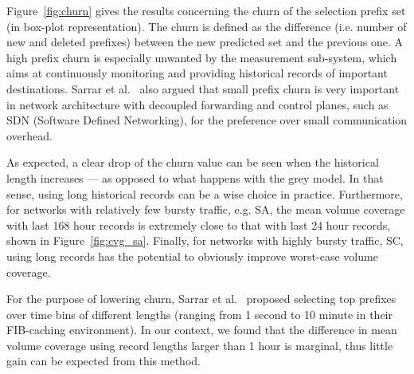 Figure~\ref{fig:churn} gives the results concerning the churn of the selection prefix set (in box-plot representation).
The churn is defined as the difference (i.e. number of new and deleted prefixes) between the new predicted set and the previous one. A high prefix churn is especially unwanted by the measurement sub-system, which aims at continuously monitoring and providing historical records of important destinations.  Sarrar et al.\ \cite{Sarrar2012} also argued that small prefix churn is very important in network architecture with decoupled forwarding and control planes, such as SDN (Software Defined Networking), for the preference over small communication overhead.

As expected, a clear drop of the churn value can be seen when the historical length increases --- as opposed to what happens with the grey model.
In that sense, using long historical records can be a wise choice in practice.
Furthermore, for networks with relatively few bursty traffic, e.g. SA, the mean volume coverage with last 168 hour records is extremely close to that with last 24 hour records, shown in Figure~\ref{fig:cvg_sa}.
Finally, for networks with highly bursty traffic, SC, using long records has the potential to obviously improve worst-case volume coverage. 

For the purpose of lowering churn, Sarrar et al.\ \cite{Sarrar2012} proposed selecting top prefixes over time bins of different lengths (ranging from 1 second to 10 minute in their FIB-caching environment). In our context, we found that the difference in mean volume coverage using record lengths larger than 1 hour is marginal, thus little gain can be expected from this method.  


